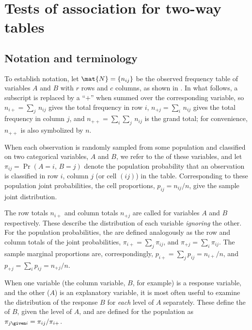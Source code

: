 \documentclass[11pt]{book}
\begin{document}
\section{Tests of association for two-way tables}\label{sec:twoway-tests}

\subsection{Notation and terminology}\label{sec:twoway-notation}
To establish notation, let \(\mat{N}  =  \{  n_{ij}  \}\) be the
observed frequency table of variables \(A\) and \(B\) with \(r\) rows
and \(c\) columns, as shown in .
In what follows, a subscript is replaced by a ``$+$''
when summed over the corresponding variable, so \(n_{i+}  =  \sum_j \,
n_{ij}\) gives the total frequency in row \(i\), \(n_{+j}  =  \sum_i \,
n_{ij}\) gives the total frequency in column \(j\), and \(n_{++}  =
\sum_i \sum_j \,  n_{ij}\) is the grand total; for convenience,
\(n_{++}\) is also symbolized by \(n\).


When each observation is randomly sampled from some population
and classified on two categorical variables, $A$ and $B$,
we refer to the  of these variables,
and let $\pi_{ij} = \Pr(A=i,\,B=j)$ denote the population
probability that
an observation is classified in row $i$, column $j$ (or cell $(ij)$)
in the table.
Corresponding to these population joint probabilities, the
cell proportions, $p_{ij} = n_{ij} / n$, give the sample joint
distribution.

The row totals $n_{i+}$ and column totals $n_{+j}$ are called 
 for variables $A$ and $B$ respectively.
These describe the distribution of each variable \emph{ignoring} the other.
For the population probabilities, the 
are defined analogously as the row and column totals of the 
joint probabilities,
$\pi_{i+} = \sum_j \pi_{ij}$, and
$\pi_{+j} = \sum_i \pi_{ij}$.
The sample marginal proportions are, correspondingly, 
$p_{i+} = \sum_j p_{ij} = n_{i+} / n$, and 
$p_{+j} = \sum_i p_{ij} = n_{+j} / n$.

When one variable (the column variable, $B$, for example) is a response
variable, and the other ($A$) is an explanatory variable,
it is most often useful to examine the distribution of the response $B$
for \emph{each} level of $A$ separately.
These define the  of $B$, given the
level of $A$, and are defined for the population as
$\pi_{j\given i} = \pi_{ij} / \pi_{i+}$.
\end{document}
